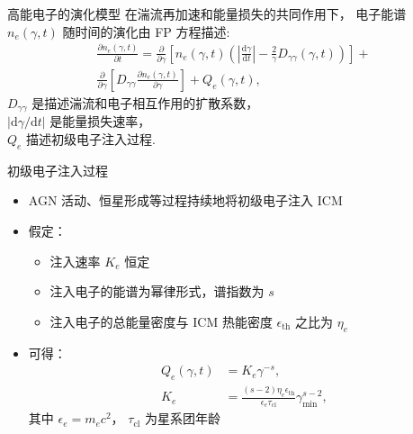\documentclass{beamer}
\newcommand{\R}[1]{\text{#1}}  %
\newcommand{\D}[1]{\R{d}#1}
\newcommand{\diff}[2]{\frac{\D{#1}}{\D{#2}}}
\newcommand{\pdiff}[2]{\frac{\partial #1}{\partial #2}}
\begin{document}
\begin{frame}{高能电子的演化模型}
  在\alert{湍流再加速}和\alert{能量损失}的共同作用下，
  电子能谱 $n_e(\gamma, t)$ 随时间的演化由 \alert{FP 方程}描述:
  \begin{multline}
    \pdiff{n_e(\gamma, t)}{t} =
      \pdiff{}{\gamma} \left[ n_e(\gamma, t) \left(
        \left| \diff{\gamma}{t} \right| -
        \frac{2}{\gamma} D_{\gamma\gamma}(\gamma, t) \right) \right] + \\
      \pdiff{}{\gamma} \left[
      D_{\gamma\gamma} \pdiff{n_e(\gamma, t)}{\gamma} \right]
      + Q_e(\gamma, t) ,
  \end{multline}
  $D_{\gamma\gamma}$ 是描述湍流和电子相互作用的扩散系数，\\
  $|\R{d}\gamma / \R{d}t|$ 是能量损失速率，\\
  $Q_e$ 描述初级电子注入过程.
\end{frame}

\begin{frame}
  \begin{alertblock}{初级电子注入过程}
    \smallskip
    \begin{itemize}
      \item AGN 活动、恒星形成等过程持续地将初级电子注入 ICM
      \item 假定：
        \begin{itemize}
          \item 注入速率 $K_e$ 恒定
          \item 注入电子的能谱为幂律形式，谱指数为 $s$
          \item 注入电子的总能量密度与 ICM 热能密度 $\epsilon_{\R{th}}$
            之比为 $\eta_e$
        \end{itemize}
      \item 可得：
        \begin{align}
          Q_e(\gamma, t) & = K_e \gamma^{-s} , \\
          K_e & = \frac{(s-2) \eta_e \epsilon_{\R{th}}}{
            \epsilon_e \tau_{\R{cl}}} \gamma_{\R{min}}^{s-2} ,
        \end{align}
        其中 $\epsilon_e = m_e c^2$，
        $\tau_{\R{cl}}$ 为星系团年龄
    \end{itemize}
  \end{alertblock}
\end{frame}
\end{document}
